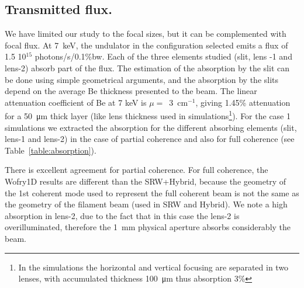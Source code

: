 \documentclass{iucr}              %
\begin{document}

\subsection{Transmitted flux.} We have limited our study to the focal sizes, but it can be complemented with focal flux. At \SI{7}{keV}, the undulator in the configuration selected emits a flux of 1.5 10$^{15}$ photons/s/0.1\%bw. Each of the three elements studied (slit, lens -1 and lens-2) absorb part of the flux. The estimation of the absorption by the slit can be done using simple geometrical arguments, and the absorption by the slits depend on the average Be thickness presented to the beam. The linear attenuation coefficient of Be at 7 keV is $\mu=$~\SI{3}{\centi\meter}$^{-1}$, giving 1.45\% attenuation for a \SI{50}{\micro\meter} thick layer (like lens thickness used in simulations\footnote{In the simulations the horizontal and vertical focusing are separated in two lenses, with accumulated thickness \SI{100}{\micro\meter} thus absorption 3\%}). For the case 1 simulations we extracted the absorption for the different absorbing elements (slit, lens-1 and lens-2) in the case of partial coherence and also for full coherence (see Table~\ref{table:absorption}).

There is excellent agreement for partial coherence. For full coherence, the Wofry1D results are different than the SRW+Hybrid, because the geometry of the 1st coherent mode used to represent the full coherent beam is not the same as the geometry of the filament beam (used in SRW and Hybrid). We note a high absorption in lens-2, due to the fact that in this case the lens-2 is overilluminated, therefore the \SI{1}{\milli\meter} physical aperture absorbs considerably the beam.


\end{document}
